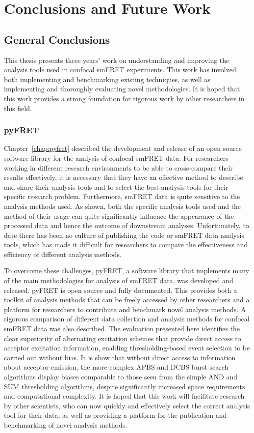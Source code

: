 \chapter{Conclusions and Future Work}
\label{chap:conclusions}

\section{General Conclusions}
This thesis presents three years' work on understanding and improving the analysis tools used in confocal smFRET experiments. This work has involved both implementing and benchmarking existing techniques, as well as implementing and thoroughly evaluating novel methodologies. It is hoped that this work provides a strong foundation for rigorous work by other researchers in this field.

\subsection{pyFRET}
Chapter~\ref{chap:pyfret} described the development and release of an open source software library for the analysis of confocal smFRET data. For researchers working in different research environments to be able to cross-compare their results effectively, it is necessary that they have an effective method to describe and share their analysis tools and to select the best analysis tools for their specific research problem. Furthermore, smFRET data is quite sensitive to the analysis methods used.  As shown, both the specific analysis tools used and the method of their usage can quite significantly influence the appearance of the processed data and hence the outcome of downstream analyses. Unfortunately, to date there has been no culture of publishing the code or smFRET data analysis tools, which has made it difficult for researchers to compare the effectiveness and efficiency of different analysis methods.

To overcome these challenges, pyFRET, a software library that implements many of the main methodologies for analysis of smFRET data, was developed and released. pyFRET is open source and fully documented. This provides both a toolkit of analysis methods that can be freely accessed by other researchers and a platform for researchers to contribute and benchmark novel analysis methods. A rigorous comparison of different data collection and analysis methods for confocal smFRET data was also described. The evaluation presented here identifies the clear superiority of alternating excitation schemes that provide direct access to acceptor excitation information, enabling thresholding-based event selection to be carried out without bias. It is show that without direct access to information about acceptor emission, the more complex APBS and DCBS burst search algorithms display biases comparable to those seen from the simple AND and SUM thresholding algorithms, despite significantly increased space requirements and computational complexity. It is hoped that this work will facilitate research by other scientists, who can now quickly and effectively select the correct analysis tool for their data, as well as providing a platform for the publication and benchmarking of novel analysis methods.

